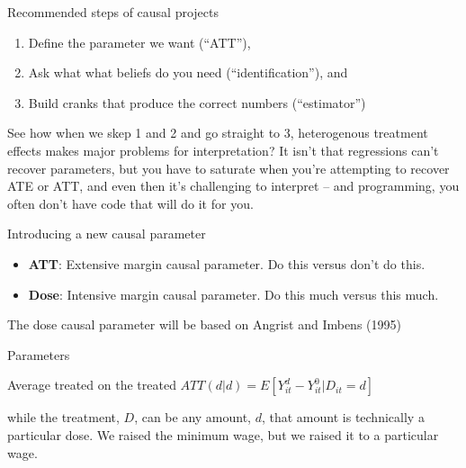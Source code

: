 \documentclass{beamer}
\begin{document}
\begin{frame}{Recommended steps of causal projects}

\begin{enumerate}
\item Define the parameter we want (``ATT''), 
\item Ask what what beliefs do you need (``identification''), and 
\item Build cranks that produce the correct numbers (``estimator'')
\end{enumerate}

\bigskip

See how when we skep 1 and 2 and go straight to 3, heterogenous treatment effects makes major problems for interpretation?  It isn't that regressions can't recover parameters, but you have to saturate when you're attempting to recover ATE or ATT, and even then it's challenging to interpret -- and programming, you often don't have code that will do it for you.

\end{frame}






\begin{frame}{Introducing a new causal parameter}



\begin{itemize}
\item \textbf{ATT}: Extensive margin causal parameter.  Do this versus don't do this.
\item \textbf{Dose}: Intensive margin causal parameter.  Do this much versus this much.
\end{itemize}

\bigskip

The dose causal parameter will be based on Angrist and Imbens (1995)

\end{frame}




\begin{frame}{Parameters}

\begin{block}{Average treated on the treated}
$ATT(d|d) = E[Y^d_{it} - Y^0_{it} | D_{it}=d]$
\end{block}

\bigskip

while the treatment, $D$, can be any amount, $d$, that amount is technically a particular dose.  We raised the minimum wage, but we raised it to a particular wage. 

\end{frame}
\end{document}
